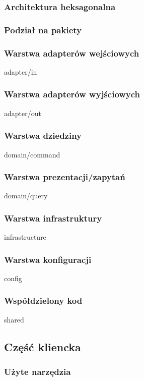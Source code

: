 \subsubsection{Architektura heksagonalna}

\subsubsection{Podział na pakiety}

\subsubsection{Warstwa adapterów wejściowych} adapter/in

\subsubsection{Warstwa adapterów wyjściowych} adapter/out

\subsubsection{Warstwa dziedziny} domain/command

\subsubsection{Warstwa prezentacji/zapytań} domain/query

\subsubsection{Warstwa infrastruktury} infrastructure

\subsubsection{Warstwa konfiguracji} config

\subsubsection{Współdzielony kod} shared

\subsection{Część kliencka}

\subsubsection{Użyte narzędzia}

